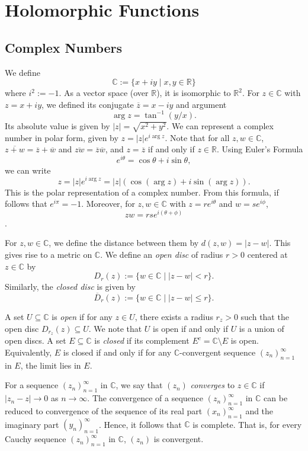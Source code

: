 \documentclass[a4paper, openany]{memoir}
\theoremstyle{definition}
\theoremstyle{plain}
\begin{document}
    \chapter{Holomorphic Functions}
    \section{Complex Numbers}

    We define
    \[\mathbb{C} := \{x + iy \mid x, y \in \mathbb{R}\}\]
    where $i^2 := -1$. As a vector space (over $\mathbb{R}$), it is isomorphic to $\mathbb{R}^2$. For $z \in \mathbb{C}$ with $z = x + iy$, we defined its conjugate $\overline{z} = x - iy$ and argument 
    \[\arg z = \tan^{-1} (y/x).\]
    Its absolute value is given by $|z| = \sqrt{x^2 + y^2}$. We can represent a complex number in polar form, given by $z = |z| e^{i \arg z}$. Note that for all $z, w \in \mathbb{C}$, $\overline{z + w} = \overline{z} + \overline{w}$ and $\overline{zw} = \overline{z}\overline{w}$, and $z = \overline{z}$ if and only if $z \in \mathbb{R}$. Using Euler's Formula
    \[e^{i\theta} = \cos \theta + i \sin \theta,\]
    we can write
    \[z = |z|e^{i \arg z} = |z| (\cos (\arg z) + i \sin (\arg z)).\]
    This is the polar representation of a complex number. From this formula, if follows that $e^{i \pi} = -1$. Moreover, for $z, w \in \mathbb{C}$ with $z = re^{i\theta
    }$ and $w = se^{i\phi}$, 
    \[zw = rs e^{i(\theta + \phi)}\].

    For $z, w \in \mathbb{C}$, we define the distance between them by $d(z, w) = |z - w|$. This gives rise to a metric on $\mathbb{C}$. We define an \emph{open disc} of radius $r > 0$ centered at $z \in \mathbb{C}$ by
    \[D_r(z) := \{w \in \mathbb{C} \mid |z - w| < r\}.\]
    Similarly, the \emph{closed disc} is given by
    \[\overline{D}_r(z) := \{w \in \mathbb{C} \mid |z -  w| \leq r\}.\]
    
    A set $U \subseteq \mathbb{C}$ is \emph{open} if for any $z \in U$, there exists a radius $r_z > 0$ such that the open disc $D_{r_z}(z) \subseteq U$. We note that $U$ is open if and only if $U$ is a union of open discs. A set $E \subseteq \mathbb{C}$ is \emph{closed} if its complement $E^c = \mathbb{C} \setminus E$ is open. Equivalently, $E$ is closed if and only if for any $\mathbb{C}$-convergent sequence $(z_n)_{n=1}^\infty$ in $E$, the limit lies in $E$.

    For a sequence $(z_n)_{n=1}^\infty$ in $\mathbb{C}$, we say that $(z_n)$ \emph{converges} to $z \in \mathbb{C}$ if $|z_n - z| \to 0$ as $n \to \infty$. The convergence of a sequence $(z_n)_{n=1}^\infty$ in $\mathbb{C}$ can be reduced to convergence of the sequence of its real part $(x_n)_{n=1}^\infty$ and the imaginary part $(y_n)_{n=1}^\infty$. Hence, it follows that $\mathbb{C}$ is complete. That is, for every Cauchy sequence $(z_n)_{n=1}^\infty$ in $\mathbb{C}$, $(z_n)$ is convergent.
\end{document}
